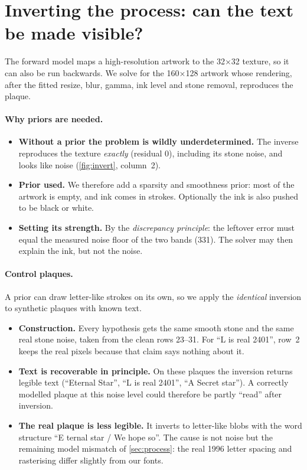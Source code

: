 \documentclass[10pt,a4paper]{article}
\newcommand{\q}[1]{``#1''}
\begin{document}
\section{Inverting the process: can the text be made visible?}
\label{sec:invert}
The forward model maps a high-resolution artwork to the 32$\times$32 texture, so it can also be run backwards. We
solve for the 160$\times$128 artwork whose rendering, after the fitted resize, blur, gamma, ink level and stone removal,
reproduces the plaque.

\paragraph{Why priors are needed.}
\begin{itemize}
\item \textbf{Without a prior the problem is wildly underdetermined.} The inverse reproduces the texture
\emph{exactly} (residual 0), including its stone noise, and looks like noise (\cref{fig:invert}, column~2).
\item \textbf{Prior used.} We therefore add a sparsity and smoothness prior: most of the artwork is empty, and ink comes
in strokes. Optionally the ink is also pushed to be black or white.
\item \textbf{Setting its strength.} By the \emph{discrepancy principle}: the leftover error must equal the measured
noise floor of the two bands (331). The solver may then explain the ink, but not the noise.
\end{itemize}

\paragraph{Control plaques.}
A prior can draw letter-like strokes on its own, so we apply the \emph{identical} inversion to synthetic plaques with
known text.
\begin{itemize}
\item \textbf{Construction.} Every hypothesis gets the same smooth stone and the same real stone noise, taken from the
clean rows 23--31. For \q{L is real 2401}, row~2 keeps the real pixels because that claim says nothing about it.
\item \textbf{Text is recoverable in principle.} On these plaques the inversion returns legible text (\q{Eternal Star},
\q{L is real 2401}, \q{A Secret star}). A correctly modelled plaque at this noise level could therefore be partly
\q{read} after inversion.
\item \textbf{The real plaque is less legible.} It inverts to letter-like blobs with the word structure \q{E ternal
star / We hope so}. The cause is not noise but the remaining model mismatch of \cref{sec:process}: the real 1996 letter
spacing and rasterising differ slightly from our fonts.
\end{itemize}
\end{document}
